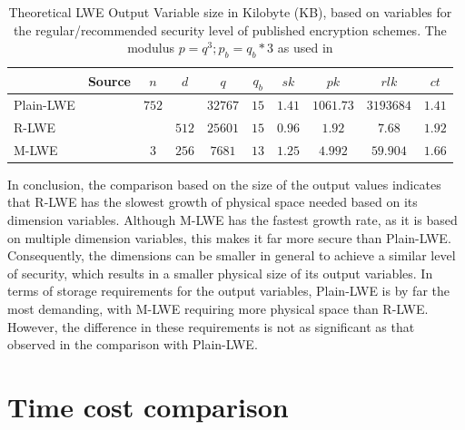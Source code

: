 \begin{table}[htp]
  \centering
  \caption[Theoretical LWE HE output variable sizes]{Theoretical LWE Output Variable size in Kilobyte (KB), based on variables for the regular/recommended security level of published encryption schemes. The modulus $p=q^3; p_b=q_b*3$ as used in \cite{bfv}}
  \begin{tabular}{|l|c||c|c|c|c||c|c|c|c|}
    \toprule
              & Source                      & $n$   & $d$   & $q$      & $q_b$ & $sk$    & $pk$      & $rlk$    & $ct$    \\
    \midrule
    Plain-LWE & \cite{frodo}                & $752$ &       & $32767$  & $15$  & $1.41$  & $1061.73$ & $3193684$ & $1.41$ \\
    R-LWE     & \cite{PracticalKeyExchange} &       & $512$ & $25601$ & $15$  & $0.96$  & $1.92$    & $7.68$   & $1.92$  \\
    M-LWE     & \cite{CyrstalsKyber}        & $3$   & $256$ & $7681$   & $13$  & $1.25$ & $4.992$   & $59.904$ & $1.66$ \\
    \bottomrule
  \end{tabular}
  \label{table:OutputVariableInKB}
\end{table}

In conclusion, the comparison based on the size of the output values indicates that R-LWE has the slowest growth of physical space needed based on its dimension variables. Although M-LWE has the fastest growth rate, as it is based on multiple dimension variables, this makes it far more secure than Plain-LWE. Consequently, the dimensions can be smaller in general to achieve a similar level of security, which results in a smaller physical size of its output variables. In terms of storage requirements for the output variables, Plain-LWE is by far the most demanding, with M-LWE requiring more physical space than R-LWE. However, the difference in these requirements is not as significant as that observed in the comparison with Plain-LWE.

\section{Time cost comparison}

